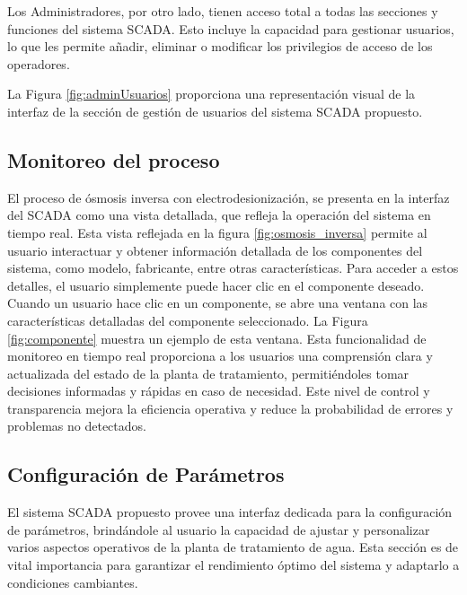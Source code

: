 Los Administradores, por otro lado, tienen acceso total a todas las secciones y funciones del sistema SCADA. Esto incluye la capacidad para gestionar usuarios, lo que les permite añadir, eliminar o modificar los privilegios de acceso de los operadores.

La Figura \ref{fig:adminUsuarios} proporciona una representación visual de la interfaz de la sección de gestión de usuarios del sistema SCADA propuesto.
\subsection{Monitoreo del proceso}

El proceso de ósmosis inversa con electrodesionización, se presenta en la interfaz del SCADA como una vista detallada, que refleja la operación del sistema en tiempo real. Esta vista reflejada en la figura \ref{fig:osmosis_inversa} permite al usuario interactuar y obtener información detallada de los componentes del sistema, como modelo, fabricante, entre otras características. Para acceder a estos detalles, el usuario simplemente puede hacer clic en el componente deseado.
Cuando un usuario hace clic en un componente, se abre una ventana con las características detalladas del componente seleccionado. La Figura \ref{fig:componente} muestra un ejemplo de esta ventana.
Esta funcionalidad de monitoreo en tiempo real proporciona a los usuarios una comprensión clara y actualizada del estado de la planta de tratamiento, permitiéndoles tomar decisiones informadas y rápidas en caso de necesidad. Este nivel de control y transparencia mejora la eficiencia operativa y reduce la probabilidad de errores y problemas no detectados.
\subsection{Configuración de Parámetros}
El sistema SCADA propuesto provee una interfaz dedicada para la configuración de parámetros, brindándole al usuario la capacidad de ajustar y personalizar varios aspectos operativos de la planta de tratamiento de agua. Esta sección es de vital importancia para garantizar el rendimiento óptimo del sistema y adaptarlo a condiciones cambiantes.

